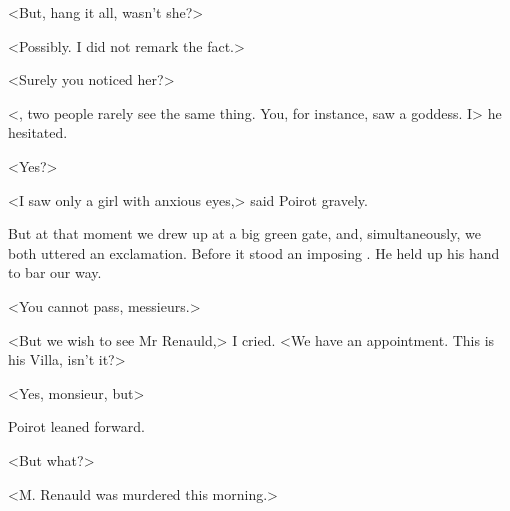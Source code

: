  <But, hang it all, wasn't she?> 

 <Possibly. I did not remark the fact.> 

 <Surely you noticed her?> 

 <, two people rarely see the same thing. You, for instance, saw a goddess. I\longdash> he hesitated. 

 <Yes?> 

 <I saw only a girl with anxious eyes,> said Poirot gravely. 

 But at that moment we drew up at a big green gate, and, simultaneously, we both uttered an exclamation. Before it stood an imposing . He held up his hand to bar our way. 

 <You cannot pass, messieurs.> 

 <But we wish to see Mr Renauld,> I cried. <We have an appointment. This is his Villa, isn't it?> 

 <Yes, monsieur, but\longdash> 

 Poirot leaned forward. 

 <But what?> 

 <M. Renauld was murdered this morning.>